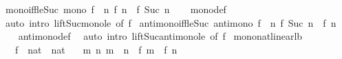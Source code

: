 \begin{isabellebody}
\endisatagproof
{\isafoldproof}%
%
\isadelimproof
\isanewline
%
\endisadelimproof
\isanewline
{}\isamarkupfalse%
\isanewline
\isanewline
{}\isamarkupfalse%
\ mono{\isacharunderscore}{\kern0pt}iff{\isacharunderscore}{\kern0pt}le{\isacharunderscore}{\kern0pt}Suc{\isacharcolon}{\kern0pt}\ {\isachardoublequoteopen}mono\ f\ {\isasymlongleftrightarrow}\ {\isacharparenleft}{\kern0pt}{\isasymforall}n{\isachardot}{\kern0pt}\ f\ n\ {\isasymle}\ f\ {\isacharparenleft}{\kern0pt}Suc\ n{\isacharparenright}{\kern0pt}{\isacharparenright}{\kern0pt}{\isachardoublequoteclose}\isanewline
%
\isadelimproof
\ \ %
\endisadelimproof
%
\isatagproof
{}\isamarkupfalse%
\ mono{\isacharunderscore}{\kern0pt}def\ \isamarkupfalse%
\ {\isacharparenleft}{\kern0pt}auto\ intro{\isacharcolon}{\kern0pt}\ lift{\isacharunderscore}{\kern0pt}Suc{\isacharunderscore}{\kern0pt}mono{\isacharunderscore}{\kern0pt}le\ {\isacharbrackleft}{\kern0pt}of\ f{\isacharbrackright}{\kern0pt}{\isacharparenright}{\kern0pt}%
\endisatagproof
{\isafoldproof}%
%
\isadelimproof
\isanewline
%
\endisadelimproof
\isanewline
{}\isamarkupfalse%
\ antimono{\isacharunderscore}{\kern0pt}iff{\isacharunderscore}{\kern0pt}le{\isacharunderscore}{\kern0pt}Suc{\isacharcolon}{\kern0pt}\ {\isachardoublequoteopen}antimono\ f\ {\isasymlongleftrightarrow}\ {\isacharparenleft}{\kern0pt}{\isasymforall}n{\isachardot}{\kern0pt}\ f\ {\isacharparenleft}{\kern0pt}Suc\ n{\isacharparenright}{\kern0pt}\ {\isasymle}\ f\ n{\isacharparenright}{\kern0pt}{\isachardoublequoteclose}\isanewline
%
\isadelimproof
\ \ %
\endisadelimproof
%
\isatagproof
{}\isamarkupfalse%
\ antimono{\isacharunderscore}{\kern0pt}def\ \isamarkupfalse%
\ {\isacharparenleft}{\kern0pt}auto\ intro{\isacharcolon}{\kern0pt}\ lift{\isacharunderscore}{\kern0pt}Suc{\isacharunderscore}{\kern0pt}antimono{\isacharunderscore}{\kern0pt}le\ {\isacharbrackleft}{\kern0pt}of\ f{\isacharbrackright}{\kern0pt}{\isacharparenright}{\kern0pt}%
\endisatagproof
{\isafoldproof}%
%
\isadelimproof
\isanewline
%
\endisadelimproof
\isanewline
{}\isamarkupfalse%
\ mono{\isacharunderscore}{\kern0pt}nat{\isacharunderscore}{\kern0pt}linear{\isacharunderscore}{\kern0pt}lb{\isacharcolon}{\kern0pt}\isanewline
\ \ \ f\ {\isacharcolon}{\kern0pt}{\isacharcolon}{\kern0pt}\ {\isachardoublequoteopen}nat\ {\isasymRightarrow}\ nat{\isachardoublequoteclose}\isanewline
\ \ \ {\isachardoublequoteopen}{\isasymAnd}m\ n{\isachardot}{\kern0pt}\ m\ {\isacharless}{\kern0pt}\ n\ {\isasymLongrightarrow}\ f\ m\ {\isacharless}{\kern0pt}\ f\ n{\isachardoublequoteclose}\isanewline

\end{isabellebody}
